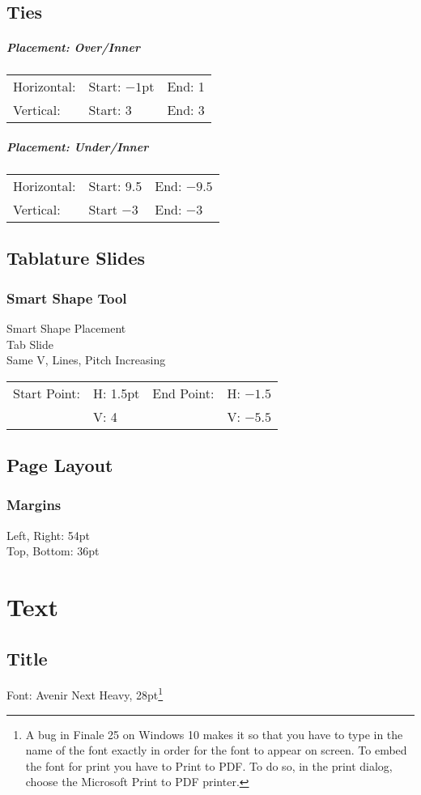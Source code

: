 \documentclass[]{memoir}
\begin{document}
\section{Ties}
\paragraph{Placement: Over/Inner}
\begin{tabular}{l l l}
Horizontal: & Start: $-1$pt & End: 1\\
Vertical: & Start: 3 & End: 3\\
\end{tabular}
\paragraph{Placement: Under/Inner}
\begin{tabular}{l l l}
Horizontal: & Start: 9.5 & End: $-9.5$\\
Vertical: & Start $-3$ & End: $-3$
\end{tabular}
\section{Tablature Slides}
\subsection{Smart Shape Tool}
Smart Shape Placement\\
Tab Slide\\
Same V, Lines, Pitch Increasing\\
\begin{tabular}{l l l l}
Start Point: & H: 1.5pt & End Point: & H: $-1.5$\\
& V: 4 & & V: $-5.5$\\
\end{tabular}
\section{Page Layout}
\subsection{Margins}
Left, Right: 54pt\\
Top, Bottom: 36pt
\chapter{Text}
\section{Title}
Font: Avenir Next Heavy, 28pt\footnote{A bug in Finale 25 on Windows
  10 makes it so that you have to type in the name of the font exactly
  in order for the font to appear on screen. To embed the font for
  print you have to Print to PDF. To do so, in the print dialog,
  choose the Microsoft Print to PDF printer.}
\end{document}
